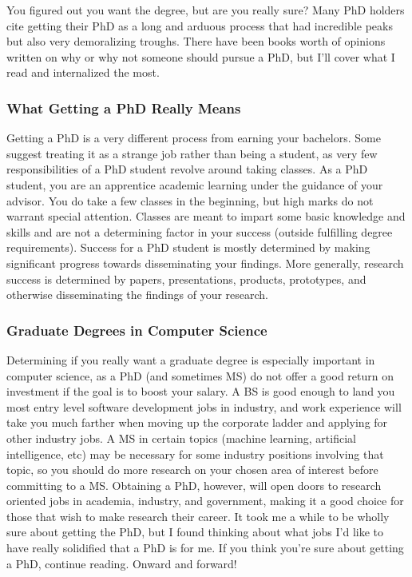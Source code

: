 \documentclass[12pt]{article}
\begin{document}
You figured out you want the degree, but are you really sure? Many PhD holders cite getting their PhD as a long and arduous process that had incredible peaks but also very demoralizing troughs. \cite{AzumaPhD} There have been books worth of opinions written on why or why not someone should pursue a PhD, but I'll cover what I read and internalized the most.

\subsubsection{What Getting a PhD Really Means}

Getting a PhD is a very different process from earning your bachelors. Some suggest treating it as a strange job rather than being a student, as very few responsibilities of a PhD student revolve around taking classes. \cite{AzumaPhD} As a PhD student, you are an apprentice academic learning under the guidance of your advisor. You do take a few classes in the beginning, but high marks do not warrant special attention. Classes are meant to impart some basic knowledge and skills and are not a determining factor in your success (outside fulfilling degree requirements). Success for a PhD student is mostly determined by making significant progress towards disseminating your findings. More generally, research success is determined by papers, presentations, products, prototypes, and otherwise disseminating the findings of your research.

\subsubsection{Graduate Degrees in Computer Science}

Determining if you really want a graduate degree is especially important in computer science, as a PhD (and sometimes MS) do not offer a good return on investment if the goal is to boost your salary. A BS is good enough to land you most entry level software development jobs in industry, and work experience will take you much farther when moving up the corporate ladder and applying for other industry jobs. A MS in certain topics (machine learning, artificial intelligence, etc) may be necessary for some industry positions involving that topic, so you should do more research on your chosen area of interest before committing to a MS. Obtaining a PhD, however, will open doors to research oriented jobs in academia, industry, and government, making it a good choice for those that wish to make research their career. \cite{robertsonwebsite} It took me a while to be wholly sure about getting the PhD, but I found thinking about what jobs I'd like to have really solidified that a PhD is for me. If you think you're sure about getting a PhD, continue reading. Onward and forward!
\end{document}
